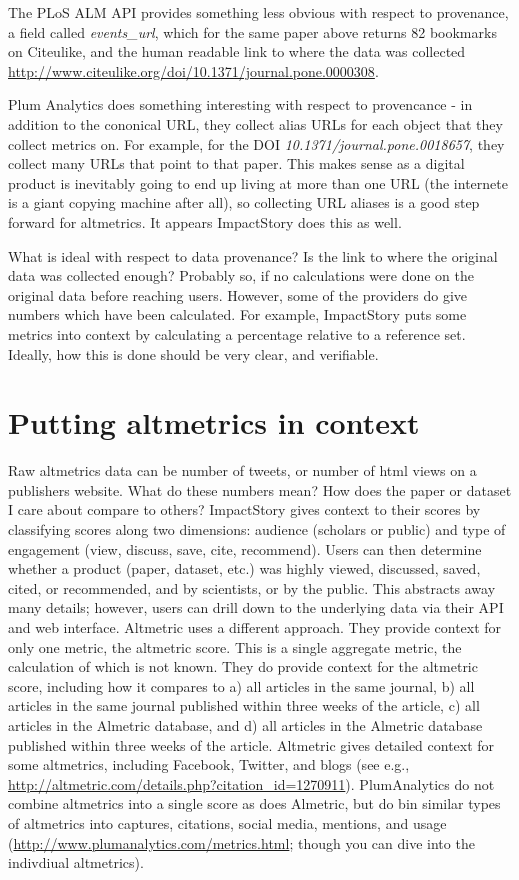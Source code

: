 \documentclass[letterpaper,superscriptaddress,showkeys,longbibliography]{revtex4-1}\usepackage{graphicx, color}
\begin{document}
The PLoS ALM API provides something less obvious with respect to provenance, a field called \emph{events\_url}, which for the same paper above \cite{piwowar2007} returns 82 bookmarks on Citeulike, and the human readable link to where the data was collected \url{http://www.citeulike.org/doi/10.1371/journal.pone.0000308}. 

Plum Analytics does something interesting with respect to provencance - in addition to the cononical URL, they collect alias URLs for each object that they collect metrics on. For example, for the DOI \emph{10.1371/journal.pone.0018657}, they collect many URLs that point to that paper. This makes sense as a digital product is inevitably going to end up living at more than one URL (the internete is a giant copying machine after all), so collecting URL aliases is a good step forward for altmetrics. It appears ImpactStory does this as well.

What is ideal with respect to data provenance? Is the link to where the original data was collected enough? Probably so, if no calculations were done on the original data before reaching users. However, some of the providers do give numbers which have been calculated. For example, ImpactStory puts some metrics into context by calculating a percentage relative to a reference set. Ideally, how this is done should be very clear, and verifiable. 

\section*{Putting altmetrics in context}

Raw altmetrics data can be number of tweets, or number of html views on a publishers website. What do these numbers mean? How does the paper or dataset I care about compare to others? ImpactStory gives context to their scores by classifying scores along two dimensions: audience (scholars or public) and type of engagement (view, discuss, save, cite, recommend). Users can then determine whether a product (paper, dataset, etc.) was highly viewed, discussed, saved, cited, or recommended, and by scientists, or by the public. This abstracts away many details; however, users can drill down to the underlying data via their API and web interface.  Altmetric uses a different approach. They provide context for only one metric, the altmetric score. This is a single aggregate metric, the calculation of which is not known. They do provide context for the altmetric score, including how it compares to a) all articles in the same journal, b) all articles in the same journal published within three weeks of the article, c) all articles in the Almetric database, and d) all articles in the Almetric database published within three weeks of the article. Altmetric gives detailed context for some altmetrics, including Facebook, Twitter, and blogs (see e.g., \url{http://altmetric.com/details.php?citation_id=1270911}). PlumAnalytics do not combine altmetrics into a single score as does Almetric, but do bin similar types of altmetrics into captures, citations, social media, mentions, and usage (\url{http://www.plumanalytics.com/metrics.html}; though you can dive into the indivdiual altmetrics). 
\end{document}
